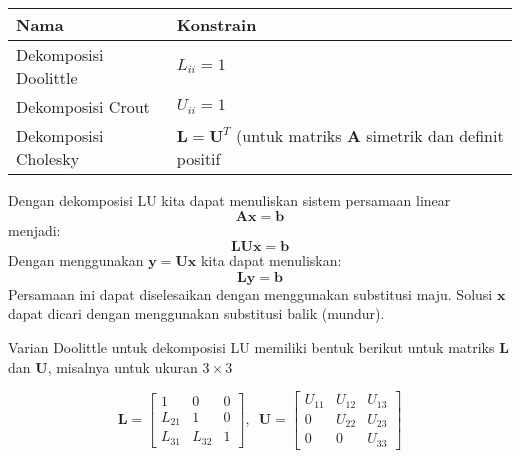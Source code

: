 \documentclass[10pt]{article}
\begin{document}
\begin{longtable}[]{@{}ll@{}}
\toprule
\begin{minipage}[b]{0.29\columnwidth}\raggedright
Nama\strut
\end{minipage} & \begin{minipage}[b]{0.65\columnwidth}\raggedright
Konstrain\strut
\end{minipage}\tabularnewline
\midrule
\endhead
\begin{minipage}[t]{0.29\columnwidth}\raggedright
Dekomposisi Doolittle\strut
\end{minipage} & \begin{minipage}[t]{0.65\columnwidth}\raggedright
\(L_{ii} = 1\)\strut
\end{minipage}\tabularnewline
\begin{minipage}[t]{0.29\columnwidth}\raggedright
Dekomposisi Crout\strut
\end{minipage} & \begin{minipage}[t]{0.65\columnwidth}\raggedright
\(U_{ii} = 1\)\strut
\end{minipage}\tabularnewline
\begin{minipage}[t]{0.29\columnwidth}\raggedright
Dekomposisi Cholesky\strut
\end{minipage} & \begin{minipage}[t]{0.65\columnwidth}\raggedright
\(\mathbf{L} = \mathbf{U}^{T}\) (untuk matriks \(\mathbf{A}\) simetrik
dan definit positif\strut
\end{minipage}\tabularnewline
\bottomrule
\end{longtable}

    Dengan dekomposisi LU kita dapat menuliskan sistem persamaan linear \[
\mathbf{Ax} = \mathbf{b}
\] menjadi: \[
\mathbf{LUx} = \mathbf{b}
\] Dengan menggunakan \(\mathbf{y} = \mathbf{Ux}\) kita dapat
menuliskan: \[
\mathbf{Ly} = \mathbf{b}
\] Persamaan ini dapat diselesaikan dengan menggunakan substitusi maju.
Solusi \(\mathbf{x}\) dapat dicari dengan menggunakan substitusi balik
(mundur).

    Varian Doolittle untuk dekomposisi LU memiliki bentuk berikut untuk
matriks \(\mathbf{L}\) dan \(\mathbf{U}\), misalnya untuk ukuran
\(3\times3\)

\[
\mathbf{L} =
\begin{bmatrix}
1 & 0 & 0 \\
L_{21} & 1 & 0 \\
L_{31} & L_{32} & 1
\end{bmatrix},\,\,\,
\mathbf{U} =
\begin{bmatrix}
U_{11} & U_{12} & U_{13} \\
0 & U_{22} & U_{23} \\
0 & 0 & U_{33}
\end{bmatrix}
\]
\end{document}
